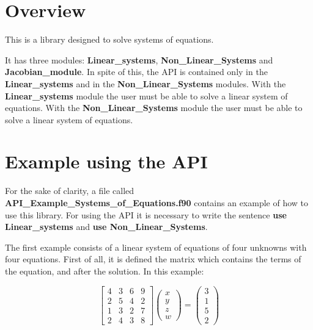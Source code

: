 \section{Overview}

This is a library designed to solve systems of equations.

It has three modules: \textbf{Linear\_systems}, \textbf{Non\_Linear\_Systems} and \textbf{Jacobian\_module}. In spite of this, the API is contained only in the \textbf{Linear\_systems} and in the \textbf{Non\_Linear\_Systems} modules. With the \textbf{Linear\_systems} module the user must be able to solve a linear system of equations. With the \textbf{Non\_Linear\_Systems} module the user must be able to solve a linear system of equations. 

\section{Example using the API}

For the sake of clarity, a file called \textbf{API\_Example\_Systems\_of\_Equations.f90} contains an example of how to use this library. For using the API it is necessary to write the sentence \textbf{use Linear\_systems} and \textbf{use Non\_Linear\_Systems}.

The first example consists of a linear system of equations of four unknowns with four equations. First of all, it is defined the matrix which contains the terms of the equation, and after the solution. In this example:

 \begin{equation*} 
    \left[ \begin{array}{cccc}
    4 & 3 & 6 & 9 \\
    2 & 5 & 4 & 2 \\
    1 & 3 & 2 & 7 \\
    2 & 4 & 3 & 8
    \end{array}\right]  
     \left( \begin{array}{c}
    x  \\
    y  \\
    z  \\
    w 
    \end{array}\right) 
    = 
    \left( \begin{array}{c}
    3  \\
    1  \\
    5  \\
    2 
    \end{array}\right) 
 \end{equation*}
 
